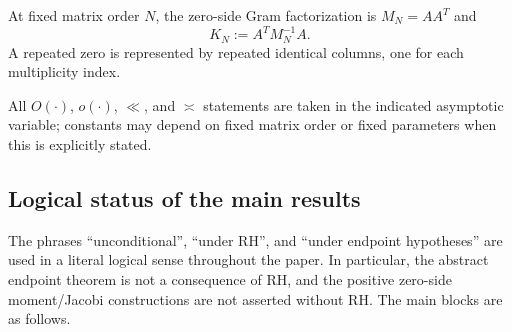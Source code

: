 \documentclass[preprint,12pt]{elsarticle}
\numberwithin{equation}{section}
\theoremstyle{plain}
\theoremstyle{definition}
\theoremstyle{remark}
\newcommand{\RH}{\mathrm{RH}}
\begin{document}
\begin{description}[style=nextline,leftmargin=2.2em,itemsep=5pt]
\item[Zero-index kernels]
At fixed matrix order \(N\), the zero-side Gram factorization is \(M_N=AA^T\) and
\[
K_N:=A^TM_N^{-1}A.
\]
A repeated zero is represented by repeated identical columns, one for each multiplicity
index.

\item[Asymptotic notation]
All \(O(\cdot)\), \(o(\cdot)\), \(\ll\), and \(\asymp\) statements are taken in the
indicated asymptotic variable; constants may depend on fixed matrix order or fixed
parameters when this is explicitly stated.
\end{description}

\subsection{Logical status of the main results}
\label{subsec:logical_status}
The phrases ``unconditional'', ``under \(\RH\)'', and ``under endpoint hypotheses'' are used in a
literal logical sense throughout the paper.  In particular, the abstract endpoint theorem is not a
consequence of \(\RH\), and the positive zero-side moment/Jacobi constructions are not asserted
without \(\RH\).  The main blocks are as follows.
\end{document}
